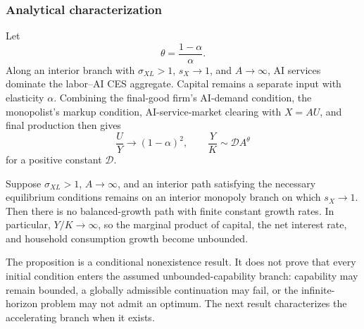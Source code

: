 \subsubsection{Analytical characterization}

Let
\begin{equation}
 \theta=\frac{1-\alpha}{\alpha}.
 \label{eq:axm-theta}
\end{equation}
Along an interior branch with \(\sigma_{XL}>1\), \(s_X\to1\), and
\(A\to\infty\), AI services dominate the labor--AI CES aggregate. Capital
remains a separate input with elasticity \(\alpha\). Combining the final-good
firm's AI-demand condition, the monopolist's markup condition,
AI-service-market clearing with \(X=AU\), and final production then gives
\begin{equation}
 \frac{U}{Y}\to(1-\alpha)^2,\qquad
 \frac{Y}{K}\sim \mathcal D A^\theta
 \label{eq:axm-high-sigma-scaling}
\end{equation}
for a positive constant \(\mathcal D\).

\begin{proposition}
\label{prop:axm-no-bgp}
Suppose \(\sigma_{XL}>1\), \(A\to\infty\), and an interior path satisfying the
necessary equilibrium conditions remains on an
interior monopoly branch on which \(s_X\to1\). Then there is no balanced-growth
path with finite constant growth rates. In particular, \(Y/K\to\infty\), so the marginal
product of capital, the net interest rate, and household consumption growth
become unbounded.
\end{proposition}

The proposition is a conditional nonexistence result. It does not prove that every
initial condition enters the assumed unbounded-capability branch: capability may
remain bounded, a globally admissible continuation may fail, or the
infinite-horizon problem may not admit an optimum. The next result characterizes
the accelerating branch when it exists.


